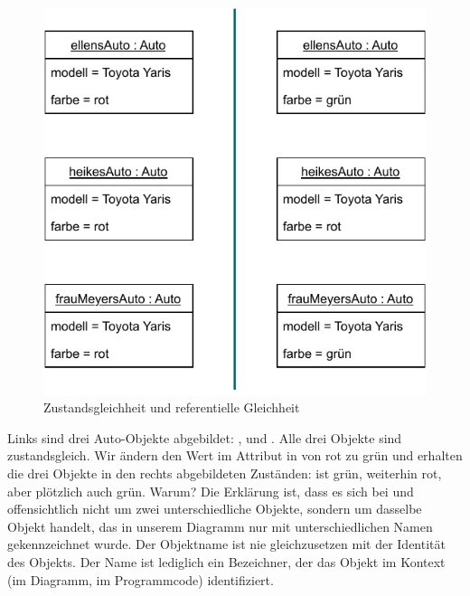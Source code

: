 \begin{figure}[h!]
	\centering
	\includegraphics[scale=1.0]{Bilder/Kapitel-8/zustands_referentielle_gleichheit.pdf}
	\caption{Zustandsgleichheit und referentielle Gleichheit}
	\label{fig:zustands_referentielle_gleichheit}
\end{figure}

\pagebreak %

Links sind drei Auto-Objekte abgebildet: ,  und 
\linebreak %
. Alle drei Objekte sind zustandsgleich. Wir ändern den Wert im Attribut  in  von rot zu grün und erhalten die drei Objekte in den rechts abgebildeten Zuständen:  ist grün,  weiterhin rot, aber  plötzlich auch grün. Warum? Die Erklärung ist, dass es sich bei  und  offensichtlich nicht um zwei unterschiedliche Objekte, sondern um dasselbe Objekt handelt, das in unserem Diagramm nur mit unterschiedlichen Namen gekennzeichnet wurde. Der Objektname ist nie gleichzusetzen mit der Identität des Objekts. Der Name ist lediglich ein Bezeichner, der das Objekt im Kontext (\zb im Diagramm, im Programmcode) identifiziert.

